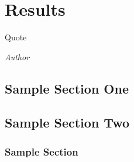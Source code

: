 \documentclass[class=report,11pt,crop=false]{standalone}
\begin{document}
\chapter{Results}
\epigraph{Quote}%
    {\emph{Author}}

\section{Sample Section One}

\blindmathpaper

\section{Sample Section Two}

\blindmathpaper

\subsection{Sample Section}

\blindtext












\ifstandalone

\fi
\end{document}
